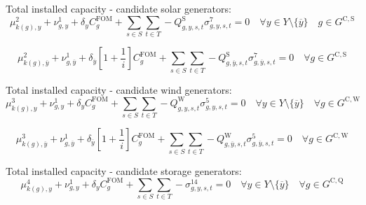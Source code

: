 \documentclass{article}
\newcommand{\sGeneratorsCandidateWind}{G^{\mathrm{C,W}}}
\newcommand{\sGeneratorsCandidateSolar}{G^{\mathrm{C,S}}}
\newcommand{\sStorageCandidate}{G^{\mathrm{C,Q}}}
\newcommand{\sYears}{Y}
\newcommand{\sScenarios}{S}
\newcommand{\sIntervals}{T}
\newcommand{\iGenerator}{g}
\newcommand{\iYear}{y}
\newcommand{\iYearTerminal}{\overline{\iYear}}
\newcommand{\iScenario}{s}
\newcommand{\iInterval}{t}
\newcommand{\iZone}{z}
\newcommand{\cFixedOperationsMaintenanceCostGenerator}[1][\iGenerator]{C^{\mathrm{FOM}}_{#1}}
\newcommand{\cInterestRate}{i}
\newcommand{\cCapacityFactorWind}[1][\iGenerator,\iYear,\iScenario,\iInterval]{Q_{#1}^{\mathrm{W}}}
\newcommand{\cCapacityFactorSolar}[1][\iGenerator,\iYear,\iScenario,\iInterval]{Q_{#1}^{\mathrm{S}}}
\newcommand{\cDiscountRate}[1][\iYear]{\delta_{#1}}
\newcommand{\dSolarBuildLimit}[1][\iZone,\iYear]{\mu_{#1}^{2}}
\newcommand{\dWindBuildLimit}[1][\iZone,\iYear]{\mu_{#1}^{3}}
\newcommand{\dStorageBuildLimit}[1][\iZone,\iYear]{\mu_{#1}^{4}}
\newcommand{\dTotalInstallCapacity}[1][\iGenerator,\iYear]{\nu_{#1}^{1}}
\newcommand{\dMaxPowerOutputWindCandidate}[1][\iGenerator,\iYear,\iScenario,\iInterval]{\sigma_{#1}^{5}}
\newcommand{\dMaxPowerOutputSolarCandidate}[1][\iGenerator,\iYear,\iScenario,\iInterval]{\sigma_{#1}^{7}}
\newcommand{\dMaxDischargingRateCandidate}[1][\iGenerator,\iYear,\iScenario,\iInterval]{\sigma_{#1}^{14}}
\begin{document}
Total installed capacity - candidate solar generators:
\begin{equation}
\dSolarBuildLimit[k(\iGenerator), \iYear] + \dTotalInstallCapacity + \cDiscountRate \cFixedOperationsMaintenanceCostGenerator + \sum\limits_{\iScenario \in \sScenarios}\sum\limits_{\iInterval \in \sIntervals} - \cCapacityFactorSolar \dMaxPowerOutputSolarCandidate = 0 \quad \forall \iYear \in \sYears \setminus \{\iYearTerminal\} \quad \iGenerator \in \sGeneratorsCandidateSolar
\end{equation}

\begin{equation}
\dSolarBuildLimit[k(\iGenerator),\iYearTerminal] + \dTotalInstallCapacity[\iGenerator,\iYearTerminal] + \cDiscountRate[\iYearTerminal] \left[1 + \frac{1}{\cInterestRate}\right] \cFixedOperationsMaintenanceCostGenerator + \sum\limits_{\iScenario \in \sScenarios}\sum\limits_{\iInterval \in \sIntervals} - \cCapacityFactorSolar[\iGenerator,\iYearTerminal,\iScenario,\iInterval] \dMaxPowerOutputSolarCandidate[\iGenerator,\iYearTerminal,\iScenario,\iInterval] = 0 \quad \forall \iGenerator \in \sGeneratorsCandidateSolar
\end{equation}

Total installed capacity - candidate wind generators:
\begin{equation}
\dWindBuildLimit[k(\iGenerator), \iYear] + \dTotalInstallCapacity + \cDiscountRate \cFixedOperationsMaintenanceCostGenerator + \sum\limits_{\iScenario \in \sScenarios}\sum\limits_{\iInterval \in \sIntervals} - \cCapacityFactorWind \dMaxPowerOutputWindCandidate = 0 \quad \forall \iYear \in \sYears \setminus \{\iYearTerminal\} \quad \forall \iGenerator \in \sGeneratorsCandidateWind
\end{equation}

\begin{equation}
\dWindBuildLimit[k(\iGenerator),\iYearTerminal] + \dTotalInstallCapacity[\iGenerator,\iYearTerminal] + \cDiscountRate[\iYearTerminal] \left[1 + \frac{1}{\cInterestRate}\right] \cFixedOperationsMaintenanceCostGenerator + \sum\limits_{\iScenario \in \sScenarios}\sum\limits_{\iInterval \in \sIntervals} - \cCapacityFactorWind[\iGenerator,\iYearTerminal,\iScenario,\iInterval] \dMaxPowerOutputWindCandidate[\iGenerator,\iYearTerminal,\iScenario,\iInterval] = 0 \quad \forall \iGenerator \in \sGeneratorsCandidateWind
\end{equation}

Total installed capacity - candidate storage generators:
\begin{equation}
\dStorageBuildLimit[k(\iGenerator), \iYear] + \dTotalInstallCapacity + \cDiscountRate \cFixedOperationsMaintenanceCostGenerator + \sum\limits_{\iScenario \in \sScenarios}\sum\limits_{\iInterval \in \sIntervals} - \dMaxDischargingRateCandidate = 0 \quad \forall \iYear \in \sYears \setminus \{\iYearTerminal\} \quad \forall \iGenerator \in \sStorageCandidate
\end{equation}
\end{document}

